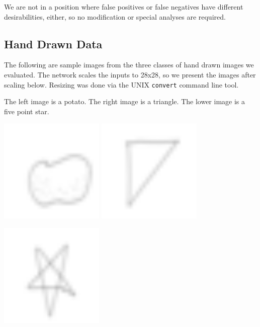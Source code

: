 \documentclass[leqno]{article}
\begin{document}
We are not in a position where false positives or false negatives
have different desirabilities, either, so no modification or special analyses
are required.

\subsection{Hand Drawn Data}
The following are sample images from the three classes of hand drawn images we evaluated. The network
scales the inputs to 28x28, so we present the images after scaling below. Resizing was done via the UNIX \texttt{convert} command line tool.

The left image is a potato. The right image is a triangle. The lower image is a
five point star.


\strut
\noindent\null\hfill
\includegraphics[width=5cm]{potato.png} \hfill
\includegraphics[width=5cm]{triangle.png} \hfill\null

\noindent\null\hfill\includegraphics[width=5cm]{star.png} \hfill
\end{document}
